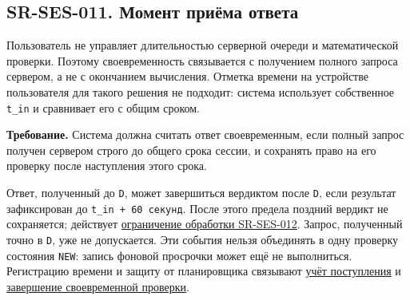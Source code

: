 \documentclass[12pt,a4paper]{article}
\begin{document}
\subsection{SR-SES-011. Момент приёма ответа}\label{sr-ses-011-ux43cux43eux43cux435ux43dux442-ux43fux440ux438ux451ux43cux430-ux43eux442ux432ux435ux442ux430}

\hypertarget{sr-ses-011-момент-приёма-ответа}{}

Пользователь не управляет длительностью серверной очереди и математической проверки. Поэтому своевременность связывается с получением полного запроса сервером, а не с окончанием вычисления. Отметка времени на устройстве пользователя для такого решения не подходит: система использует собственное \texttt{t\_in} и сравнивает его с общим сроком.

\textbf{Требование.} Система должна считать ответ своевременным, если полный запрос получен сервером строго до общего срока сессии, и сохранять право на его проверку после наступления этого срока.

Ответ, полученный до \texttt{D}, может завершиться вердиктом после \texttt{D}, если результат зафиксирован до \texttt{t\_in\ +\ 60\ секунд}. После этого предела поздний вердикт не сохраняется; действует \hyperref[sr-ses-012-ux43eux433ux440ux430ux43dux438ux447ux435ux43dux43dux430ux44f-ux434ux43bux438ux442ux435ux43bux44cux43dux43eux441ux442ux44c-ux43eux431ux440ux430ux431ux43eux442ux43aux438]{ограничение обработки SR-SES-012}. Запрос, полученный точно в \texttt{D}, уже не допускается. Эти события нельзя объединять в одну проверку состояния \texttt{NEW}: запись фоновой просрочки может ещё не выполниться. Регистрацию времени и защиту от планировщика связывают \href{../07_\%D0\%9F\%D1\%80\%D0\%BE\%D0\%B3\%D1\%80\%D0\%B0\%D0\%BC\%D0\%BC\%D0\%BD\%D1\%8B\%D0\%B5_\%D1\%82\%D1\%80\%D0\%B5\%D0\%B1\%D0\%BE\%D0\%B2\%D0\%B0\%D0\%BD\%D0\%B8\%D1\%8F/DOC-06.2_\%D0\%A1\%D0\%B5\%D1\%81\%D1\%81\%D0\%B8\%D0\%B8_\%D0\%B7\%D0\%B0\%D0\%B4\%D0\%B0\%D1\%87_\%D0\%B8_\%D0\%BF\%D0\%BB\%D0\%B0\%D0\%BD\%D0\%B8\%D1\%80\%D0\%BE\%D0\%B2\%D1\%89\%D0\%B8\%D0\%BA.pdf\#nameddest=swr-ses-007-\%D1\%80\%D0\%B5\%D0\%B3\%D0\%B8\%D1\%81\%D1\%82\%D1\%80\%D0\%B0\%D1\%86\%D0\%B8\%D1\%8F-\%D0\%B2\%D1\%80\%D0\%B5\%D0\%BC\%D0\%B5\%D0\%BD\%D0\%B8-\%D0\%BF\%D0\%BE\%D1\%81\%D1\%82\%D1\%83\%D0\%BF\%D0\%BB\%D0\%B5\%D0\%BD\%D0\%B8\%D1\%8F}{учёт поступления} и \href{../07_\%D0\%9F\%D1\%80\%D0\%BE\%D0\%B3\%D1\%80\%D0\%B0\%D0\%BC\%D0\%BC\%D0\%BD\%D1\%8B\%D0\%B5_\%D1\%82\%D1\%80\%D0\%B5\%D0\%B1\%D0\%BE\%D0\%B2\%D0\%B0\%D0\%BD\%D0\%B8\%D1\%8F/DOC-06.2_\%D0\%A1\%D0\%B5\%D1\%81\%D1\%81\%D0\%B8\%D0\%B8_\%D0\%B7\%D0\%B0\%D0\%B4\%D0\%B0\%D1\%87_\%D0\%B8_\%D0\%BF\%D0\%BB\%D0\%B0\%D0\%BD\%D0\%B8\%D1\%80\%D0\%BE\%D0\%B2\%D1\%89\%D0\%B8\%D0\%BA.pdf\#nameddest=swr-ses-015-\%D0\%B7\%D0\%B0\%D0\%B2\%D0\%B5\%D1\%80\%D1\%88\%D0\%B5\%D0\%BD\%D0\%B8\%D0\%B5-\%D1\%81\%D0\%B2\%D0\%BE\%D0\%B5\%D0\%B2\%D1\%80\%D0\%B5\%D0\%BC\%D0\%B5\%D0\%BD\%D0\%BD\%D0\%BE\%D0\%B9-\%D0\%BF\%D1\%80\%D0\%BE\%D0\%B2\%D0\%B5\%D1\%80\%D0\%BA\%D0\%B8}{завершение своевременной проверки}.
\end{document}
